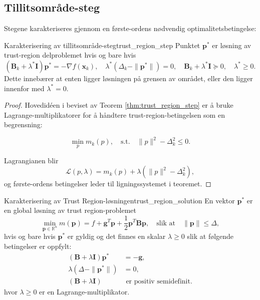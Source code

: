 \subsection{Tillitsområde-steg}
Stegene karakteriseres gjennom en første-ordens nødvendig optimalitetsbetingelse:
\begin{theorem}{Karakterisering av tillitsområde-steg}{trust_region_step}
	Punktet $\symbf{p}^\ast$ er løsning av trust-region delproblemet hvis og bare hvis
	\[
		(\symbf{B}_k + \lambda^\ast \symbf{I})\symbf{p}^\ast = -\nabla f(\symbf{x}_k), \quad \lambda^\ast (\Delta_k - \|\symbf{p}^\ast\|) = 0, \quad \symbf{B}_k + \lambda^\ast \symbf{I} \succeq 0, \quad \lambda^\ast \ge 0.
	\]
	Dette innebærer at enten ligger løsningen på grensen av området, eller den ligger innenfor med $\lambda^\ast = 0$.
\end{theorem}

\begin{proof}{}{}
	Hovedidéen i beviset av Teorem \ref{thm:trust_region_step} er å bruke Lagrange-multiplikatorer for å håndtere trust-region-betingelsen som en begrensning:

\[
	\min_p m_k(p), \quad \text{s.t.} \quad \|p\|^2 - \Delta_k^2 \leq 0.
\]

Lagrangianen blir
\[
	\mathcal{L}(p,\lambda) = m_k(p) + \lambda(\|p\|^2 - \Delta_k^2),
\]
og første-ordens betingelser leder til ligningssystemet i teoremet.
\end{proof}

\begin{theorem}{Karakterisering av Trust Region-løsningen}{trust_region_solution}
	En vektor $\symbf{p}^\ast$ er en global løsning av trust region-problemet
	\[
		\min_{\symbf{p} \in \mathbb{R}^n} m(\symbf{p}) = f + \symbf{g}^T\symbf{p} + \frac{1}{2}\symbf{p}^T\symbf{B}\symbf{p}, \quad \text{slik at} \quad \|\symbf{p}\| \leq \Delta,
	\]
	hvis og bare hvis $\symbf{p}^\ast$ er gyldig og det finnes en skalar $\lambda \geq 0$ slik at følgende betingelser er oppfylt:
	\begin{align}
		(\symbf{B} + \lambda\symbf{I})\symbf{p}^\ast & = -\symbf{g},                   \\
		\lambda(\Delta - \|\symbf{p}^\ast\|)         & = 0,                            \\
		(\symbf{B} + \lambda\symbf{I})            & \text{ er positiv semidefinit.}
	\end{align}
	hvor $\lambda \geq 0$ er en Lagrange-multiplikator.
\end{theorem}

